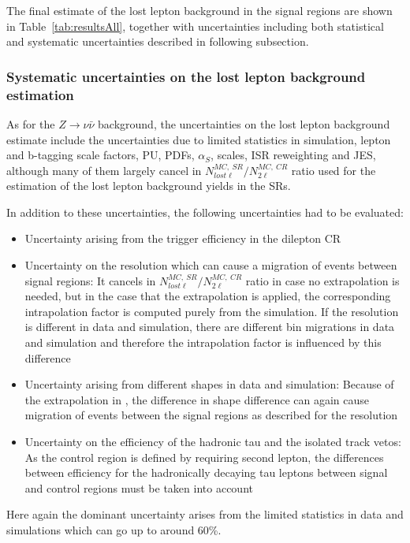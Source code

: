The final estimate of the lost lepton background in the signal regions are shown in Table~\ref{tab:resultsAll}, together with uncertainties including both statistical and systematic uncertainties described in following subsection.

\subsubsection{Systematic uncertainties on the lost lepton background estimation}

As for the $Z \to \nu \bar{\nu}$ background, the uncertainties on the lost lepton background estimate include the uncertainties due to limited statistics in simulation, lepton and b-tagging scale factors, PU,  PDFs, $\alpha_{S}$, scales, ISR reweighting and JES, although many of them largely cancel in $N^{MC,~SR}_{lost \ell}/ N^{MC,~CR}_{2\ell}$ ratio used for the estimation of the lost lepton background yields in the SRs.

In addition to these uncertainties, the following uncertainties had to be evaluated:
\begin{itemize} 
\item Uncertainty arising from the trigger efficiency in the dilepton CR
\item Uncertainty on the \MET resolution which can cause a migration of events between signal regions: It cancels in $N^{MC,~SR}_{lost \ell}/ N^{MC,~CR}_{2\ell}$ ratio in case no \MET extrapolation is needed, but in the case that the \MET extrapolation is applied, the corresponding intrapolation factor is computed purely from the simulation. If the \MET resolution is different in data and simulation, there are different bin migrations in data and simulation and therefore the intrapolation factor is influenced by this difference
\item Uncertainty arising from different \MET shapes in data and simulation: Because of the extrapolation in \MET, the difference in \MET shape difference can again cause migration of events between the signal regions as described for the \MET resolution
\item Uncertainty on the efficiency of the hadronic tau and the isolated track vetos: As the control region is defined by requiring second lepton, the differences between efficiency for the hadronically decaying tau leptons between signal and control regions must be taken into account   %
\end{itemize}

Here again the dominant uncertainty arises from the limited statistics in data and simulations which can go up to around 60\%.

